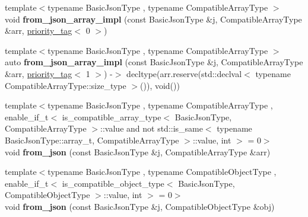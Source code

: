 \begin{DoxyCompactItemize}
\item 
\mbox{\label{namespacenlohmann_1_1detail_ac53673a5ce29fb69b96d41dad33cb3b0}} 
{\footnotesize template$<$typename Basic\+Json\+Type , typename Compatible\+Array\+Type $>$ }\\void {\bfseries from\+\_\+json\+\_\+array\+\_\+impl} (const Basic\+Json\+Type \&j, Compatible\+Array\+Type \&arr, \mbox{\hyperlink{structnlohmann_1_1detail_1_1priority__tag}{priority\+\_\+tag}}$<$ 0 $>$)
\item 
\mbox{\label{namespacenlohmann_1_1detail_a57f93ed57254a1639087cdc316e0fb83}} 
{\footnotesize template$<$typename Basic\+Json\+Type , typename Compatible\+Array\+Type $>$ }\\auto {\bfseries from\+\_\+json\+\_\+array\+\_\+impl} (const Basic\+Json\+Type \&j, Compatible\+Array\+Type \&arr, \mbox{\hyperlink{structnlohmann_1_1detail_1_1priority__tag}{priority\+\_\+tag}}$<$ 1 $>$) -\/$>$ decltype(arr.\+reserve(std\+::declval$<$ typename Compatible\+Array\+Type\+::size\+\_\+type $>$()), void())
\item 
\mbox{\label{namespacenlohmann_1_1detail_a8dcac00852dbe1f61d1e78135b19d428}} 
{\footnotesize template$<$typename Basic\+Json\+Type , typename Compatible\+Array\+Type , enable\+\_\+if\+\_\+t$<$ is\+\_\+compatible\+\_\+array\+\_\+type$<$ Basic\+Json\+Type, Compatible\+Array\+Type $>$\+::value and not std\+::is\+\_\+same$<$ typename Basic\+Json\+Type\+::array\+\_\+t, Compatible\+Array\+Type $>$\+::value, int $>$  = 0$>$ }\\void {\bfseries from\+\_\+json} (const Basic\+Json\+Type \&j, Compatible\+Array\+Type \&arr)
\item 
\mbox{\label{namespacenlohmann_1_1detail_a5e7a3674e8ac46f8feebad9712d7c55f}} 
{\footnotesize template$<$typename Basic\+Json\+Type , typename Compatible\+Object\+Type , enable\+\_\+if\+\_\+t$<$ is\+\_\+compatible\+\_\+object\+\_\+type$<$ Basic\+Json\+Type, Compatible\+Object\+Type $>$\+::value, int $>$  = 0$>$ }\\void {\bfseries from\+\_\+json} (const Basic\+Json\+Type \&j, Compatible\+Object\+Type \&obj)
\item 
\mbox{\label{namespacenlohmann_1_1detail_a839b0ab50d2c9bce669068f56bc41202}} 

\end{DoxyCompactItemize}
